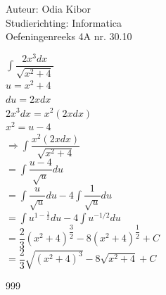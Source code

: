 \documentclass[a4paper]{article}
\begin{document}
  
\noindent \large Auteur: Odia Kibor \\
\noindent \large Studierichting: Informatica\\
\noindent \large Oefeningenreeks 4A nr. 30.10\\

\medskip

\normalsize


$\displaystyle\int \dfrac{2x^3 dx}{\sqrt{x^2 + 4}}$\\ 

$u = x^2 + 4$\\ 

$du = 2x dx$\\ 

$2x^3 dx=  x^2(2xdx)$\\

$x^2 = u - 4$\\ 

$\Rightarrow \displaystyle\int \dfrac{x^2(2xdx)}{\sqrt{x^2 + 4}}$\\ 

$= \displaystyle\int \dfrac{u - 4}{\sqrt{u}} du$\\ 

$= \displaystyle\int \dfrac{u}{\sqrt{u}} du - 4\displaystyle\int \dfrac{1}{\sqrt{u}} du$\\ 

$= \displaystyle\int u^{1 - \tfrac{1}{2}} du - 4\displaystyle\int u^{-1/2} du$\\ 

$= \dfrac{2}{3}(x^2 + 4)^{\dfrac{3}{2}} - 8(x^2 + 4)^{\dfrac{1}{2}} + C$\\ 

$= \dfrac{2}{3}\sqrt{(x^2 + 4)^3} - 8\sqrt{x^2 + 4} + C$\\



















\begin{thebibliography}{999}
\end{thebibliography}
\end{document}
